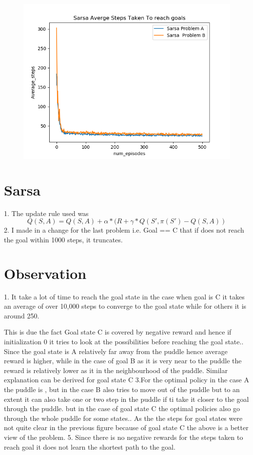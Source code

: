 \documentclass[12pt, letterpaper, twoside]{report}
\begin{document}
\newpage
\begin{figure}[h!]
  \centering
    \includegraphics[width=\linewidth]{Sarsa_avg_steps.png}
  \label{fig:Eps-Greedy}
\end{figure}
\section*{Sarsa}
1. The update rule used was \newline
\[Q(S,A) = Q(S,A) + \alpha*(R + \gamma * Q(S',\pi(S') - Q(S,A)) \]
2. I made in a change for the last problem i.e. Goal == C that if does not reach the goal within 1000 steps, it truncates.
\section*{Observation}
1. It take a lot of time to reach the goal state in the case when goal is C it takes an average of over 10,000 steps to converge to the goal state while for others it is around 250.\par
This is due the fact Goal state C is covered by negative reward and hence if initialization 0 it tries to look at the possibilities before reaching the goal state.. Since the goal state is A relatively far away from the puddle hence average reward is higher, while in the case of goal B as it is very near to the puddle the reward is relatively lower as it in the neighbourhood of the puddle. Similar explanation can be derived for goal state C \newline
3.For the optimal policy in the case A the puddle is , but in the case B also tries to move out of the puddle but to an extent it can also take one or two step in the puddle if ti take it closer to the goal through the puddle. but in the case of goal state C the optimal policies also go through the whole puddle for some states.. As the the steps for goal states were not quite clear in the previous figure because of goal state C the above is a better view of the problem.
5. Since there is no negative rewards for the steps taken to reach goal it does not learn the shortest path to the goal.
\newpage
\end{document}
